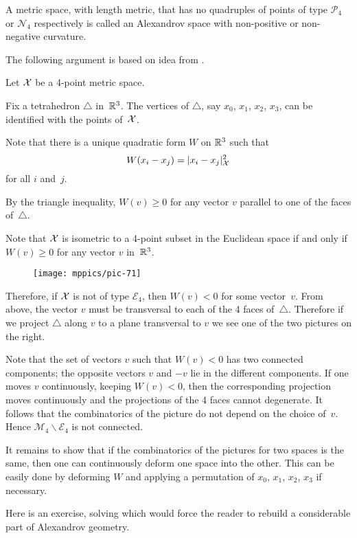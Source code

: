 A metric space, with length metric, 
that has no quadruples of points of type $\mathcal{P}_4$ or $\mathcal{N}_4$
respectively 
is called an Alexandrov space with non-positive or non-negative curvature.

The following argument is based on idea from \cite{petrunin-quest}.

Let $\mathcal{X}$ be a 4-point metric space.

Fix a tetrahedron $\triangle$ in~$\mathbb{R}^3$.
The vertices of $\triangle$, 
say $x_0$, $x_1$, $x_2$, $x_3$, can be identified with the points of~$\mathcal{X}$.

Note that there is a unique quadratic form $W$ on $\mathbb{R}^3$
such that 
\[W(x_i-x_j)=\dist[2]{x_i}{x_j}{\spc{X}}\]
for all $i$ and~$j$.

By the triangle inequality, $W(v)\ge 0$ 
for any vector $v$ parallel to one of the faces of~$\triangle$.

Note that $\mathcal{X}$ is isometric to a 4-point subset in the Euclidean space
if and only if $W(v)\ge 0$ for any vector $v$ in~$\mathbb{R}^3$.

\begin{wrapfigure}{o}{33mm}
\vskip-0mm
\centering
\texttt{[image: mppics/pic-71]}
\end{wrapfigure}

Therefore, if $\mathcal{X}$ is not of type $\mathcal{E}_4$, then $W(v)<0$ for some vector~$v$.
From above, the vector $v$ must be transversal to each of the 4 faces of~$\triangle$.
Therefore if we project $\triangle$ along $v$ to a plane transversal to $v$ we see one of the two pictures on the right.

Note that the set of vectors $v$ such that $W(v)<0$ has two connected components;
the opposite vectors $v$ and $-v$ lie in the different components.
If one moves $v$ continuously, keeping $W(v)<0$,
then the corresponding projection moves continuously and the projections of the 4 faces 
cannot degenerate. 
It follows that the combinatorics of the picture do not depend on the choice of~$v$. 
Hence $\mathcal{M}_4\backslash\mathcal{E}_4$ is not connected. 

It remains to show that if the combinatorics of the pictures for two spaces is the same, then one can continuously deform one space into the other.
This can be easily done by deforming $W$ and applying a permutation of $x_0$, $x_1$, $x_2$, $x_3$ if necessary.
\qeds

Here is an exercise, solving which would force the reader to rebuild a considerable part of Alexandrov geometry.

